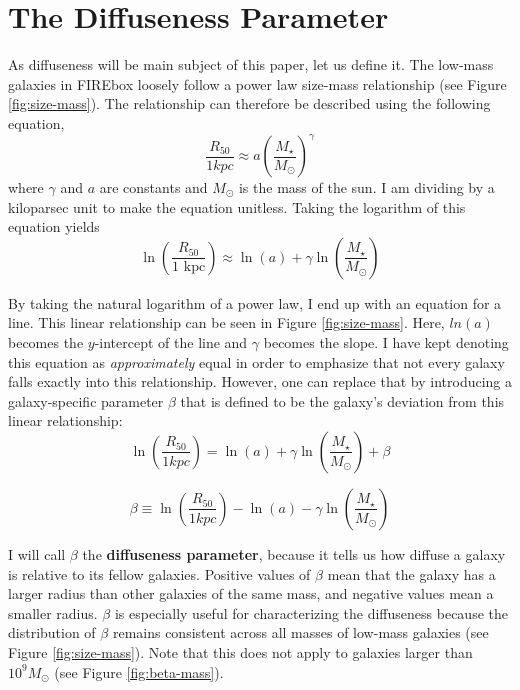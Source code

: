 \section{The Diffuseness Parameter}
As diffuseness will be main subject of this paper, let us define it. The low-mass galaxies in FIREbox loosely follow a power law size-mass relationship (see Figure \ref{fig:size-mass}). The relationship can therefore be described using the following equation,
\begin{equation}
    \frac{R_{50}}{1 kpc} \approx a
    \left(
        \frac{M_\star}{M_\odot}
    \right)
    ^{\gamma}
\end{equation}
where $\gamma$ and $a$ are constants and $M_\odot$ is the mass of the sun. I am dividing by a kiloparsec unit to make the equation unitless. Taking the logarithm of this equation yields
\begin{equation}
    \label{equ:linear-rel}
    \ln \left(
        \frac{R_{50}}{1 \text{ kpc}}
    \right)
    \approx
    \ln(a)
    + \gamma \ln \left(
        \frac{M_\star}{M_\odot}
    \right)
\end{equation}

By taking the natural logarithm of a power law, I end up with an equation for a line. This linear relationship can be seen in Figure \ref{fig:size-mass}. Here, $ln(a)$ becomes the $y$-intercept of the line and $\gamma$ becomes the slope. I have kept denoting this equation as \emph{approximately} equal in order to emphasize that not every galaxy falls exactly into this relationship. However, one can replace that by introducing a galaxy-specific parameter $\beta$ that is defined to be the galaxy's deviation from this linear relationship:
\begin{equation}
    \label{equ:log-log-with-beta}
    \ln \left(
        \frac{R_{50}}{1 kpc}
    \right)
    =
    \ln(a)
    + \gamma \ln \left(
        \frac{M_\star}{M_\odot}
    \right)
    + \beta
\end{equation} 

\begin{equation}
    \label{equ:beta}
    \beta
    \equiv
    \ln \left(
        \frac{R_{50}}{1 kpc}
    \right)
    -
    \ln(a)
    - \gamma \ln \left(
        \frac{M_\star}{M_\odot}
    \right)
\end{equation} 

I will call $\beta$ the \textbf{diffuseness parameter}, because it tells us how diffuse a galaxy is relative to its fellow galaxies. Positive values of $\beta$ mean that the galaxy has a larger radius than other galaxies of the same mass, and negative values mean a smaller radius. $\beta$ is especially useful for characterizing the diffuseness because the distribution of $\beta$ remains consistent across all masses of low-mass galaxies (see Figure \ref{fig:size-mass}). Note that this does not apply to galaxies larger than $10^9 M_\odot$ (see Figure \ref{fig:beta-mass}).


